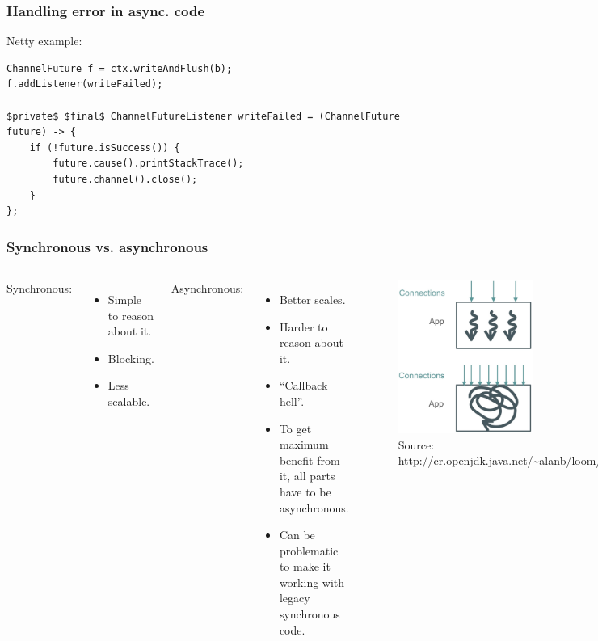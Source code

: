 \documentclass[10pt,utf8]{beamer}
\begin{document}
\begin{frame}[fragile]
    \frametitle{Handling error in async. code}
Netty example:
    \begin{lstlisting}[style=java]
ChannelFuture f = ctx.writeAndFlush(b);
f.addListener(writeFailed);

$private$ $final$ ChannelFutureListener writeFailed = (ChannelFuture future) -> {
    if (!future.isSuccess()) {
        future.cause().printStackTrace();
        future.channel().close();
    }
};
    \end{lstlisting}
\end{frame}

\begin{frame}
  \frametitle{Synchronous vs. asynchronous}
  \begin{columns}
            Synchronous:
            \begin{itemize}
                \item Simple to reason about it.
                \item Blocking.
                \item Less scalable.
            \end{itemize}
            
            \vspace{0.5cm}
            
            Asynchronous:
            \begin{itemize}
                \item Better scales.
                \item Harder to reason about it.
                \item ``Callback hell''.
                \item To get maximum benefit from it, all parts have to be asynchronous.
                \item Can be problematic to make it working with legacy synchronous code.
            \end{itemize}
            
            \begin{figure}
                \centering
                \includegraphics[height=5cm]{./img/sync_vs_async.eps}
                \caption{\tiny{Source: \url{http://cr.openjdk.java.net/~alanb/loom/Devoxx2018.pdf}}}
            \end{figure}
    \end{columns}
\end{frame}
\end{document}

